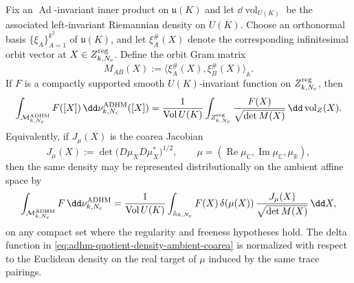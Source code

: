 \begin{proposition}
\label{prop:adhm-quotient-density-coarea}
Fix an \(\operatorname{Ad}\)-invariant inner product on
\(\mathfrak u(K)\) and let \(\dd\operatorname{vol}_{U(K)}\) be the
associated left-invariant Riemannian density on \(U(K)\).  Choose an
orthonormal basis \(\{\xi_A\}_{A=1}^{k^2}\) of \(\mathfrak u(K)\), and let
\(\xi_A^\#(X)\) denote the corresponding infinitesimal orbit vector at
\(X\in Z_{k,N_c}^{\rm reg}\).  Define the orbit Gram matrix
\[
  M_{AB}(X):=\langle \xi_A^\#(X),\xi_B^\#(X)\rangle_{\mathbb A}.
\]
If \(F\) is a compactly supported smooth \(U(K)\)-invariant function on
\(Z_{k,N_c}^{\rm reg}\), then
\begin{equation}
  \int_{\mathcal M_{k,N_c}^{\rm ADHM}}
  F([X])\,\dd\nu_{k,N_c}^{\rm ADHM}([X])
  =
  \frac1{\operatorname{Vol}U(K)}
  \int_{Z_{k,N_c}^{\rm reg}}
  \frac{F(X)}{\sqrt{\det M(X)}}\,\dd\operatorname{vol}_{Z}(X).
  \label{eq:adhm-quotient-density-levelset-coarea}
\end{equation}
Equivalently, if \(J_\mu(X)\) is the coarea Jacobian
\[
  J_\mu(X)
  :=
  \det\!\bigl(D\mu_XD\mu_X^\ast\bigr)^{1/2},
  \qquad
  \mu=(\operatorname{Re}\mu_{\mathbb C},
       \operatorname{Im}\mu_{\mathbb C},\mu_{\mathbb R}),
\]
then the same density may be represented distributionally on the ambient
affine space by
\begin{equation}
  \int_{\mathcal M_{k,N_c}^{\rm ADHM}}
  F\,\dd\nu_{k,N_c}^{\rm ADHM}
  =
  \frac1{\operatorname{Vol}U(K)}
  \int_{\mathbb A_{k,N_c}}
  F(X)\,
  \delta(\mu(X))\,
  \frac{J_\mu(X)}{\sqrt{\det M(X)}}\,
  \dd X ,
  \label{eq:adhm-quotient-density-ambient-coarea}
\end{equation}
on any compact set where the regularity and freeness hypotheses hold.  The
delta function in \eqref{eq:adhm-quotient-density-ambient-coarea} is
normalized with respect to the Euclidean density on the real target of
\(\mu\) induced by the same trace pairings.
\end{proposition}

